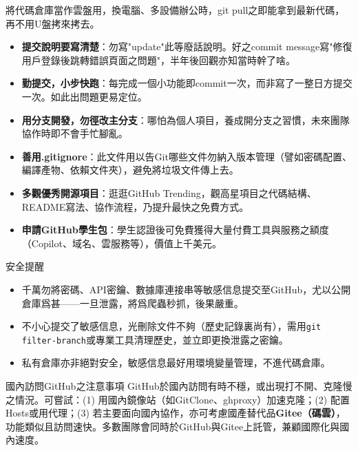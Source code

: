 
將代碼倉庫當作雲盤用，換電腦、多設備辦公時，git pull之即能拿到最新代碼，再不用U盤拷來拷去。


\begin{itemize}
  \item \textbf{提交說明要寫清楚}：勿寫"update"此等廢話說明。好之commit message寫"修復用戶登錄後跳轉錯誤頁面之問題"，半年後回觀亦知當時幹了啥。
  \item \textbf{勤提交，小步快跑}：每完成一個小功能即commit一次，而非寫了一整日方提交一次。如此出問題更易定位。
  \item \textbf{用分支開發，勿徑改主分支}：哪怕為個人項目，養成開分支之習慣，未來團隊協作時即不會手忙腳亂。
  \item \textbf{善用.gitignore}：此文件用以告Git哪些文件勿納入版本管理（譬如密碼配置、編譯產物、依賴文件夾），避免將垃圾文件傳上去。
  \item \textbf{多觀優秀開源項目}：逛逛GitHub Trending，觀高星項目之代碼結構、README寫法、協作流程，乃提升最快之免費方式。
  \item \textbf{申請GitHub學生包}：學生認證後可免費獲得大量付費工具與服務之額度（Copilot、域名、雲服務等），價值上千美元。
\end{itemize}

\begin{tcbwarn}{安全提醒}
\begin{itemize}
  \item 千萬勿將密碼、API密鑰、數據庫連接串等敏感信息提交至GitHub，尤以公開倉庫爲甚——一旦泄露，將爲爬蟲秒抓，後果嚴重。
  \item 不小心提交了敏感信息，光刪除文件不夠（歷史記錄裏尚有），需用\texttt{git filter-\allowbreak branch}或專業工具清理歷史，並立即更換泄露之密鑰。
  \item 私有倉庫亦非絕對安全，敏感信息最好用環境變量管理，不進代碼倉庫。
\end{itemize}

\end{tcbwarn}

\begin{tcbinfo}{國內訪問GitHub之注意事項}
GitHub於國內訪問有時不穩，或出現打不開、克隆慢之情況。可嘗試：(1) 用國內鏡像站（如GitClone、ghproxy）加速克隆；(2) 配置Hosts或用代理；(3) 若主要面向國內協作，亦可考慮國產替代品\textbf{Gitee（碼雲）}，功能類似且訪問速快。多數團隊會同時於GitHub與Gitee上託管，兼顧國際化與國內速度。

\end{tcbinfo}

